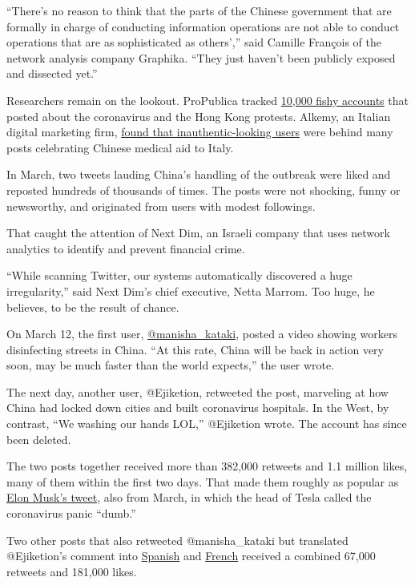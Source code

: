 ``There's no reason to think that the parts of the Chinese government
that are formally in charge of conducting information operations are not
able to conduct operations that are as sophisticated as others','' said
Camille François of the network analysis company Graphika. ``They just
haven't been publicly exposed and dissected yet.''

Researchers remain on the lookout. ProPublica tracked
\href{https://www.propublica.org/article/how-china-built-a-twitter-propaganda-machine-then-let-it-loose-on-coronavirus}{10,000
fishy accounts} that posted about the coronavirus and the Hong Kong
protests. Alkemy, an Italian digital marketing firm,
\href{https://formiche.net/2020/03/china-unleashed-twitter-bots-covid19-propaganda-italy/}{found
that inauthentic-looking users} were behind many posts celebrating
Chinese medical aid to Italy.

In March, two tweets lauding China's handling of the outbreak were liked
and reposted hundreds of thousands of times. The posts were not
shocking, funny or newsworthy, and originated from users with modest
followings.

That caught the attention of Next Dim, an Israeli company that uses
network analytics to identify and prevent financial crime.

``While scanning Twitter, our systems automatically discovered a huge
irregularity,'' said Next Dim's chief executive, Netta Marrom. Too huge,
he believes, to be the result of chance.

On March 12, the first user,
\href{https://twitter.com/manisha_kataki/status/1238007207700180992}{@manisha\_kataki},
posted a video showing workers disinfecting streets in China. ``At this
rate, China will be back in action very soon, may be much faster than
the world expects,'' the user wrote.

The next day, another user, @Ejiketion, retweeted the post, marveling at
how China had locked down cities and built coronavirus hospitals. In the
West, by contrast, ``We washing our hands LOL,'' @Ejiketion wrote. The
account has since been deleted.

The two posts together received more than 382,000 retweets and 1.1
million likes, many of them within the first two days. That made them
roughly as popular as
\href{https://twitter.com/elonmusk/status/1236029449042198528}{Elon
Musk's tweet}, also from March, in which the head of Tesla called the
coronavirus panic ``dumb.''

Two other posts that also retweeted @manisha\_kataki but translated
@Ejiketion's comment into
\href{https://twitter.com/andruklepe/status/1238573314534264838}{Spanish}
and
\href{https://twitter.com/buenvcosv/status/1238927468041588737}{French}
received a combined 67,000 retweets and 181,000 likes.

